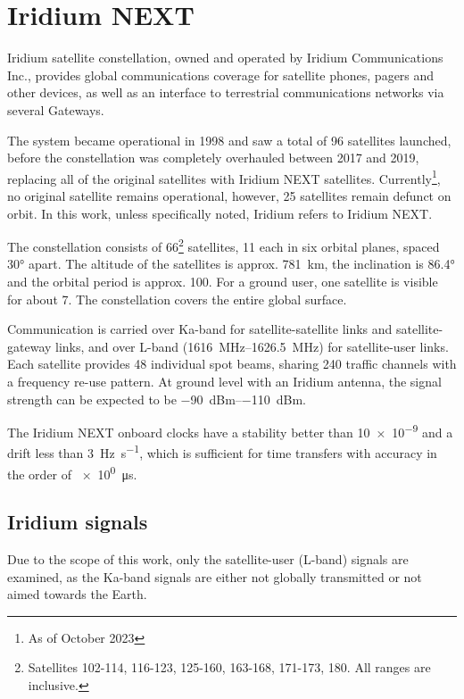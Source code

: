 \section{Iridium NEXT}
\label{s_sat_iridium}
Iridium satellite constellation, owned and operated by Iridium Communications Inc., provides global communications coverage for satellite phones, pagers and other devices, as well as an interface to terrestrial communications networks via several Gateways.

The system became operational in 1998 and saw a total of 96 satellites launched, before the constellation was completely overhauled between 2017 and 2019, replacing all of the original satellites with Iridium NEXT satellites. Currently\footnote{As of October 2023}, no original satellite remains operational, however, 25 satellites remain defunct on orbit\cite{sat06}. In this work, unless specifically noted, Iridium refers to Iridium NEXT.

The constellation consists of 66\footnote{Satellites 102-114, 116-123, 125-160, 163-168, 171-173, 180. All ranges are inclusive.} satellites, 11 each in six orbital planes, spaced \ang{30} apart. The altitude of the satellites is approx. \qty{781}{\km}, the inclination is \ang{86.4} and the orbital period is approx. \qty{100}{\min}. For a ground user, one satellite is visible for about \qty{7}{\min}. The constellation covers the entire global surface\cite{sat01}.

Communication is carried over Ka-band for satellite-satellite links and satellite-gateway links, and over L-band (\qtyrange{1616}{1626.5}{\mega\hertz}) for satellite-user links. Each satellite provides 48 individual spot beams, sharing 240 traffic channels with a frequency re-use pattern\cite{sat07}. At ground level with an Iridium antenna, the signal strength can be expected to be \qtyrange{-90}{-110}{dBm}\cite{sop01}.

The Iridium NEXT onboard clocks have a stability better than \num{10e-9} and a drift less than \qty{3}{\hertz\per\s}, which is sufficient for time transfers with accuracy in the order of \qty{e0}{\micro\s}\cite{sop11}.

\subsection{Iridium signals}
\label{s_sat_iridium_signals}
Due to the scope of this work, only the satellite-user (L-band) signals are examined, as the Ka-band signals are either not globally transmitted or not aimed towards the Earth.

